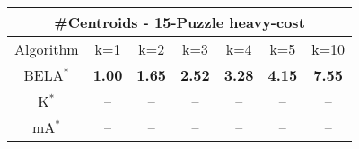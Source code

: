 \begin{tabular}{c|cccccc}\toprule
\multicolumn{7}{c}{#Centroids - 15-Puzzle heavy-cost}\\ \midrule
Algorithm & k=1 & k=2 & k=3 & k=4 & k=5 & k=10 \\ \midrule
BELA$^*$ & \textbf{1.00} & \textbf{1.65} & \textbf{2.52} & \textbf{3.28} & \textbf{4.15} & \textbf{7.55} \\
K$^*$ & -- & -- & -- & -- & -- & -- \\
mA$^*$ & -- & -- & -- & -- & -- & -- \\ \bottomrule 
\end{tabular}
